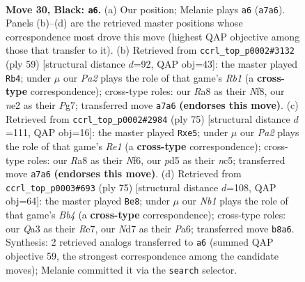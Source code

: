 \documentclass[11pt]{article}
\begin{document}
\clearpage

\begin{figure}[p]\centering
\begin{subfigure}{0.46\textwidth}\centering
\resizebox{\linewidth}{!}{%
\newchessgame
\chessboard[
  setfen={rn5k/pR1n1p2/3p4/3P2b1/4P1P1/q1NQ4/4N3/4K3 b - - 3 30},
  showmover=false,
  pgfstyle=straightmove, color=movearrow, markmove={a7-a6}
]}
\caption{}
\end{subfigure}\hfill
\begin{subfigure}{0.46\textwidth}\centering
\resizebox{\linewidth}{!}{%
\newchessgame
\chessboard[
  setfen={1r3nk1/5pp1/4p3/3nP2P/3R4/qP3N2/2QN1P2/6K1 b - - 2 30},
  showmover=false,
  pgfstyle=straightmove, color=movearrow, markmove={b8-b4}
]}
\caption{}
\end{subfigure}
\\[4pt]
\begin{subfigure}{0.46\textwidth}\centering
\resizebox{\linewidth}{!}{%
\newchessgame
\chessboard[
  setfen={4r1k1/6p1/2p2n2/2NqR3/1P1n4/3N2QP/6P1/7K b - - 0 38},
  showmover=false,
  pgfstyle=straightmove, color=movearrow, markmove={e8-e5}
]}
\caption{}
\end{subfigure}\hfill
\begin{subfigure}{0.46\textwidth}\centering
\resizebox{\linewidth}{!}{%
\newchessgame
\chessboard[
  setfen={6k1/4rNp1/pq3n1p/1b2NQ2/2P5/7P/6PK/4R3 b - - 0 38},
  showmover=false,
  pgfstyle=straightmove, color=movearrow, markmove={b5-e8}
]}
\caption{}
\end{subfigure}
\caption{\textbf{Move 30, Black: \texttt{a6}.} (a) Our position; Melanie plays \texttt{a6} (\texttt{a7a6}). Panels (b)--(d) are the retrieved master positions whose correspondence most drove this move (highest QAP objective among those that transfer to it). (b) Retrieved from \texttt{ccrl\_top\_p0002\#3132} (ply 59) [structural distance $d$=92, QAP obj=43]: the master played \texttt{Rb4}; under $\mu$ our \emph{Pa2} plays the role of that game's \emph{Rb1} (a \textbf{cross-type} correspondence); cross-type roles: our \emph{R}a8 as their \emph{N}f8, our \emph{n}e2 as their \emph{P}g7; transferred move \texttt{a7a6} \textbf{(endorses this move)}. (c) Retrieved from \texttt{ccrl\_top\_p0002\#2984} (ply 75) [structural distance $d$=111, QAP obj=16]: the master played \texttt{Rxe5}; under $\mu$ our \emph{Pa2} plays the role of that game's \emph{Re1} (a \textbf{cross-type} correspondence); cross-type roles: our \emph{R}a8 as their \emph{N}f6, our \emph{p}d5 as their \emph{n}c5; transferred move \texttt{a7a6} \textbf{(endorses this move)}. (d) Retrieved from \texttt{ccrl\_top\_p0003\#693} (ply 75) [structural distance $d$=108, QAP obj=64]: the master played \texttt{Be8}; under $\mu$ our \emph{Nb1} plays the role of that game's \emph{Bb4} (a \textbf{cross-type} correspondence); cross-type roles: our \emph{Q}a3 as their \emph{R}e7, our \emph{N}d7 as their \emph{P}a6; transferred move \texttt{b8a6}. Synthesis: 2 retrieved analogs transferred to \texttt{a6} (summed QAP objective 59, the strongest correspondence among the candidate moves); Melanie committed it via the \texttt{search} selector.}
\label{fig:thought-m59}
\end{figure}
\end{document}

